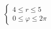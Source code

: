 \documentclass[preview]{standalone}
\begin{document}
\begin{align*}
\left\{ \begin{array}{l}4 \leq r \leq 5 \\0 \leq \varphi \leq 2 \pi\end{array} \right.
\end{align*}
\end{document}
